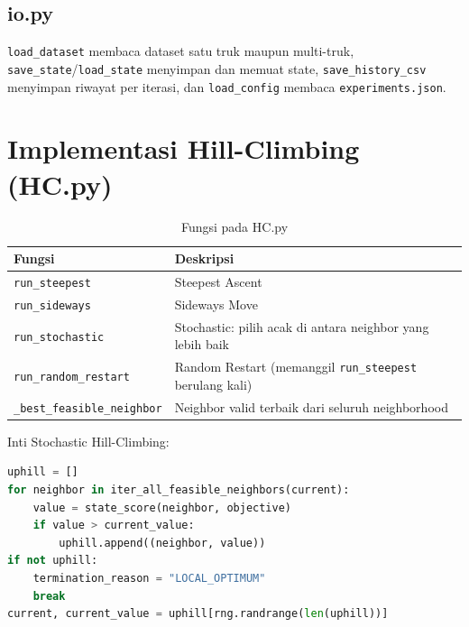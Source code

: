 \documentclass[12pt,a4paper]{report}
\newcommand{\hd}[1]{\cellcolor{hdr}\textbf{#1}}
\newcommand{\code}[1]{\texttt{\small #1}}
\begin{document}
\subsection{io.py}
\code{load\_dataset} membaca dataset satu truk maupun multi-truk, \code{save\_state}/\code{load\_state}
menyimpan dan memuat state, \code{save\_history\_csv} menyimpan riwayat per iterasi, dan
\code{load\_config} membaca \code{experiments.json}.

\section{Implementasi Hill-Climbing (HC.py)}
\begin{table}[H]
\centering
\caption{Fungsi pada HC.py}
\small
\begin{tabular}{|L{4.6cm}|L{8.6cm}|}
\hline
\hd{Fungsi} & \hd{Deskripsi} \\ \hline
\code{run\_steepest} & Steepest Ascent \\ \hline
\code{run\_sideways} & Sideways Move \\ \hline
\code{run\_stochastic} & Stochastic: pilih acak di antara neighbor yang lebih baik \\ \hline
\code{run\_random\_restart} & Random Restart (memanggil \code{run\_steepest} berulang kali) \\ \hline
\code{\_best\_feasible\_neighbor} & Neighbor valid terbaik dari seluruh neighborhood \\ \hline
\end{tabular}
\end{table}

Inti Stochastic Hill-Climbing:
\begin{lstlisting}[language=Python]
uphill = []
for neighbor in iter_all_feasible_neighbors(current):
    value = state_score(neighbor, objective)
    if value > current_value:
        uphill.append((neighbor, value))
if not uphill:
    termination_reason = "LOCAL_OPTIMUM"
    break
current, current_value = uphill[rng.randrange(len(uphill))]
\end{lstlisting}
\end{document}
